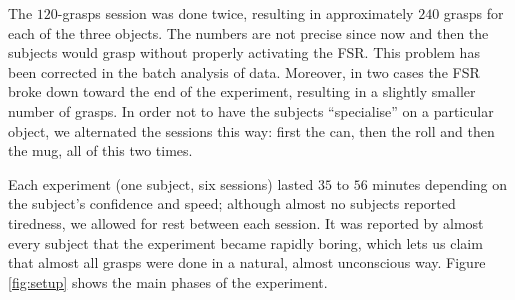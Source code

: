 The $120$-grasps session was done twice, resulting in approximately
$240$ grasps for each of the three objects. The numbers are not
precise since now and then the subjects would grasp without properly
activating the FSR. This problem has been corrected in the batch
analysis of data. Moreover, in two cases the FSR broke down toward the
end of the experiment, resulting in a slightly smaller number of
grasps. In order not to have the subjects ``specialise'' on a
particular object, we alternated the sessions this way: first the can,
then the roll and then the mug, all of this two times.

Each experiment (one subject, six sessions) lasted $35$ to $56$
minutes depending on the subject's confidence and speed; although
almost no subjects reported tiredness, we allowed for rest between
each session. It was reported by almost every subject that the
experiment became rapidly boring, which lets us claim that almost all
grasps were done in a natural, almost unconscious way. Figure
\ref{fig:setup} shows the main phases of the experiment.

